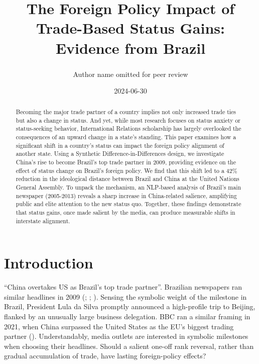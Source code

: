 \documentclass[
  12pt,
]{article}
\title{The Foreign Policy Impact of Trade-Based Status Gains: Evidence
from Brazil}
\author{Author name omitted for peer review\textsuperscript{}}
\date{2024-06-30}
\begin{document}
\maketitle
\begin{abstract}
\singlespacing Becoming the major trade partner of a country implies not
only increased trade ties but also a change in status. And yet, while
most research focuses on status anxiety or status-seeking behavior,
International Relations scholarship has largely overlooked the
consequences of an upward change in a state's standing. This paper
examines how a significant shift in a country's status can impact the
foreign policy alignment of another state. Using a Synthetic
Difference-in-Differences design, we investigate China's rise to become
Brazil's top trade partner in 2009, providing evidence on the effect of
status change on Brazil's foreign policy. We find that this shift led to
a 42\% reduction in the ideological distance between Brazil and China at
the United Nations General Assembly. To unpack the mechanism, an
NLP-based analysis of Brazil's main newspaper (2005-2013) reveals a
sharp increase in China-related salience, amplifying public and elite
attention to the new status quo. Together, these findings demonstrate
that status gains, once made salient by the media, can produce
measurable shifts in interstate alignment.
\end{abstract}

\pagebreak

\section{Introduction}\label{introduction}

``China overtakes US as Brazil's top trade partner''. Brazilian
newspapers ran similar headlines in 2009
(;
;
). Sensing the symbolic
weight of the milestone in Brazil, President Lula da Silva promptly
announced a high-profile trip to Beijing, flanked by an unusually large
business delegation. BBC ran a similar framing in 2021, when China
surpassed the United States as the EU's biggest trading partner
(). Understandably, media outlets
are interested in symbolic milestones when choosing their headlines.
Should a salient one-off rank reversal, rather than gradual accumulation
of trade, have lasting foreign-policy effects?
\end{document}
